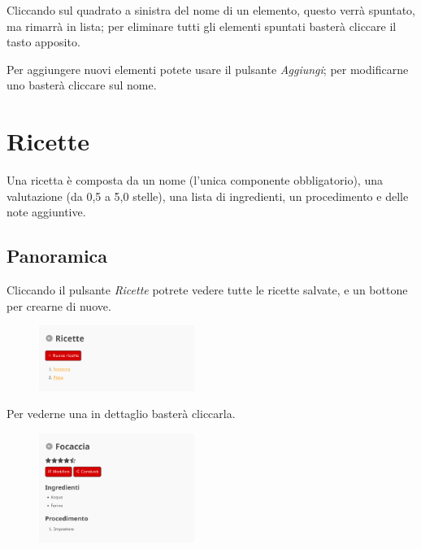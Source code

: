 \documentclass[12pt, a4paper]{article}
\begin{document}
    Cliccando sul quadrato a sinistra del nome di un elemento, questo verrà
    spuntato, ma rimarrà in lista; per eliminare tutti gli elementi spuntati
    basterà cliccare il tasto apposito.

    Per aggiungere nuovi elementi potete usare il pulsante \emph{Aggiungi}; per
    modificarne uno basterà cliccare sul nome.



    \section{Ricette}

    Una ricetta è composta da un nome (l'unica componente obbligatorio), una
    valutazione (da 0,5 a 5,0 stelle), una lista di ingredienti, un
    procedimento e delle note aggiuntive.

    \subsection{Panoramica}

    Cliccando il pulsante \emph{Ricette} potrete vedere tutte le ricette
    salvate, e un bottone per crearne di nuove.

    \begin{figure}[H]
        \centering
        \includegraphics[width=0.45\textwidth]{assets/it/recipes.png}
    \end{figure}

    Per vederne una in dettaglio basterà cliccarla.

    \begin{figure}[H]
        \centering
        \includegraphics[width=0.45\textwidth]{assets/it/recipe.png}
    \end{figure}
\end{document}
